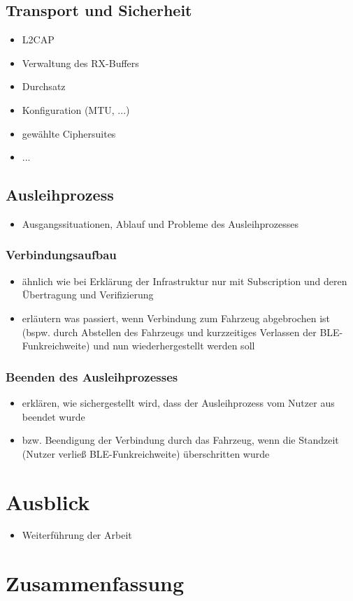 \documentclass[doktyp=barbeit]{TUBAFarbeiten}
\begin{document}
\subsection{Transport und Sicherheit}
\begin{itemize}
	\item L2CAP
	\item Verwaltung des RX-Buffers
	\item Durchsatz
	\item Konfiguration (MTU, ...)
	\item gewählte Ciphersuites
	\item ...
\end{itemize}
\subsection{Ausleihprozess}
\begin{itemize}
	\item Ausgangssituationen, Ablauf und Probleme des Ausleihprozesses
\end{itemize}
	\subsubsection{Verbindungsaufbau}
	\begin{itemize}
		\item ähnlich wie bei Erklärung der Infrastruktur nur mit Subscription und deren Übertragung und Verifizierung
		\item erläutern was passiert, wenn Verbindung zum Fahrzeug abgebrochen ist (bspw. durch Abstellen des Fahrzeugs und kurzzeitiges Verlassen der BLE-Funkreichweite) und nun wiederhergestellt werden soll
	\end{itemize}
	\subsubsection{Beenden des Ausleihprozesses}
	\begin{itemize}
		\item erklären, wie sichergestellt wird, dass der Ausleihprozess vom Nutzer aus beendet wurde
		\item bzw. Beendigung der Verbindung durch das Fahrzeug, wenn die Standzeit (Nutzer verließ BLE-Funkreichweite) überschritten wurde
	\end{itemize}

\section{Ausblick}
\begin{itemize}
	\item Weiterführung der Arbeit
\end{itemize}

\section{Zusammenfassung}

\printbibliography[heading=bibintoc]
\end{document}
